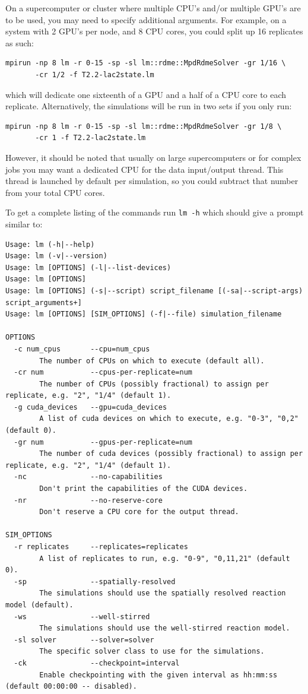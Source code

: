 On a supercomputer or cluster where multiple CPU's and/or multiple GPU's are to be used, you may need to specify additional arguments.  For example, on a system with 2 GPU's per node, and 8 CPU cores, you could split up 16 replicates as such:\\

\begin{verbatim}
mpirun -np 8 lm -r 0-15 -sp -sl lm::rdme::MpdRdmeSolver -gr 1/16 \
       -cr 1/2 -f T2.2-lac2state.lm
\end{verbatim}

which will dedicate one sixteenth of a GPU and a half of a CPU core to each replicate.  Alternatively, the simulations will be run in two sets if you only run: 

\begin{verbatim}
mpirun -np 8 lm -r 0-15 -sp -sl lm::rdme::MpdRdmeSolver -gr 1/8 \
       -cr 1 -f T2.2-lac2state.lm
\end{verbatim}

However, it should be noted that usually on large supercomputers or for complex jobs you may want a dedicated CPU for the data input/output thread.  This thread is launched by default per simulation, so you could subtract that number from your total CPU cores.  

To get a complete listing of the commands run \texttt{lm -h} which should give a prompt similar to:

{\scriptsize
\begin{verbatim}
Usage: lm (-h|--help)
Usage: lm (-v|--version)
Usage: lm [OPTIONS] (-l|--list-devices)
Usage: lm [OPTIONS]
Usage: lm [OPTIONS] (-s|--script) script_filename [(-sa|--script-args) script_arguments+]
Usage: lm [OPTIONS] [SIM_OPTIONS] (-f|--file) simulation_filename 

OPTIONS
  -c num_cpus       --cpu=num_cpus               
  		The number of CPUs on which to execute (default all).
  -cr num           --cpus-per-replicate=num     
  		The number of CPUs (possibly fractional) to assign per replicate, e.g. "2", "1/4" (default 1).
  -g cuda_devices   --gpu=cuda_devices           
  		A list of cuda devices on which to execute, e.g. "0-3", "0,2" (default 0).
  -gr num           --gpus-per-replicate=num     
  		The number of cuda devices (possibly fractional) to assign per replicate, e.g. "2", "1/4" (default 1).
  -nc               --no-capabilities            
  		Don't print the capabilities of the CUDA devices.
  -nr               --no-reserve-core            
  		Don't reserve a CPU core for the output thread.

SIM_OPTIONS
  -r replicates     --replicates=replicates      
  		A list of replicates to run, e.g. "0-9", "0,11,21" (default 0).
  -sp               --spatially-resolved         
  		The simulations should use the spatially resolved reaction model (default).
  -ws               --well-stirred               
  		The simulations should use the well-stirred reaction model.
  -sl solver        --solver=solver              
  		The specific solver class to use for the simulations.
  -ck               --checkpoint=interval        
  		Enable checkpointing with the given interval as hh:mm:ss (default 00:00:00 -- disabled).
\end{verbatim}
}

